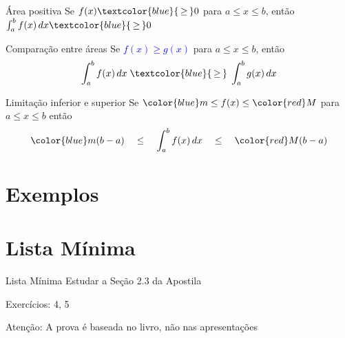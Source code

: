 \documentclass[fleqn,utf8,aspectratio=169,12pt]{beamer}
\begin{document}
\begin{frame}{Área positiva}
  \large
  Se \(f(x)\textcolor{blue}{\,\geq\,} 0\) para \(a \leq x \leq b\), então
  \(
    \int_{a}^b f(x)\,dx \textcolor{blue}{\,\geq\,} 0
  \)
\end{frame}

\begin{frame}{Comparação entre áreas}
  \large
  Se \textcolor{blue}{$f(x) \geq g(x)$}
  para $a \leq x \leq b$, então \\[9mm]
  \[
    \int_{a}^b f(x)\,dx \;\textcolor{blue}{\,\geq\,}\; \int_{a}^b g(x)\,dx
  \]
\end{frame}

\begin{frame}{Limitação inferior e superior}
  \large
  Se \({\color{blue}m} \leq f(x) \leq {\color{red}M}\) para $a \leq x \leq b$ então \\[9mm]
  \[
    {\color{blue} m}(b-a)  \quad\leq\quad
    \int_{a}^b f(x)\,dx    \quad\leq\quad
    {\color{red} M}(b-a)
  \]
\end{frame}

\section{Exemplos}






\section{Lista Mínima}

\begin{frame}{Lista Mínima}
  Estudar a Seção 2.3 da Apostila

  Exercícios: 4, 5

  \vfill
  Atenção: A prova é baseada no livro, não nas apresentações
\end{frame}

\end{document}
